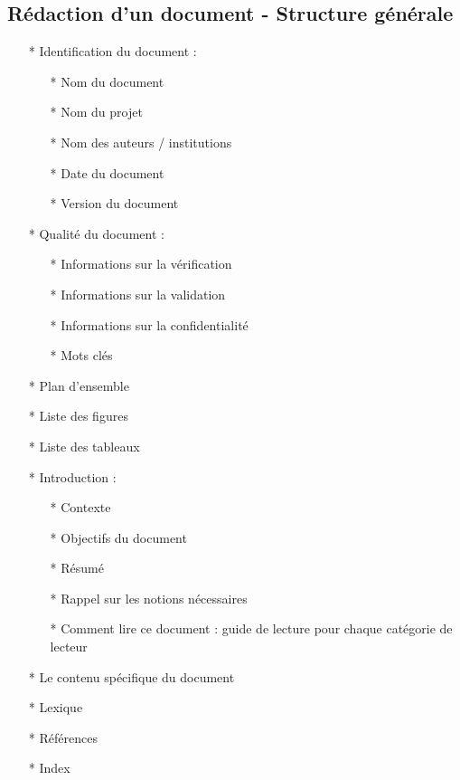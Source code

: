 \documentclass[12pt]{article}
\begin{document}
\subsection{Rédaction d'un document - Structure générale}
\begin{itemize}
	\item[* ] Identification du document :
	\begin{itemize}
		\item[* ] Nom du document
		\item[* ] Nom du projet
		\item[* ] Nom des auteurs / institutions
		\item[* ] Date du document
		\item[* ] Version du document
		
	\end{itemize}
\item[* ] Qualité du document :
\begin{itemize}
	\item[* ] Informations sur la vérification
	\item[* ] Informations sur la validation
	\item[* ] Informations sur la confidentialité
	\item[* ] Mots clés
\end{itemize}
\item[* ] Plan d'ensemble
\item[* ] Liste des figures
\item[* ] Liste des tableaux
\item[* ] Introduction :
\begin{itemize}
	\item[* ] Contexte
	\item[* ] Objectifs du document
	\item[* ] Résumé
	\item[* ] Rappel sur les notions nécessaires
	\item[* ] Comment lire ce document : guide de lecture pour chaque catégorie de lecteur
\end{itemize}
\item[* ] Le contenu spécifique du document
\item[* ] Lexique
\item[* ] Références
\item[* ] Index
\end{itemize}
\end{document}
